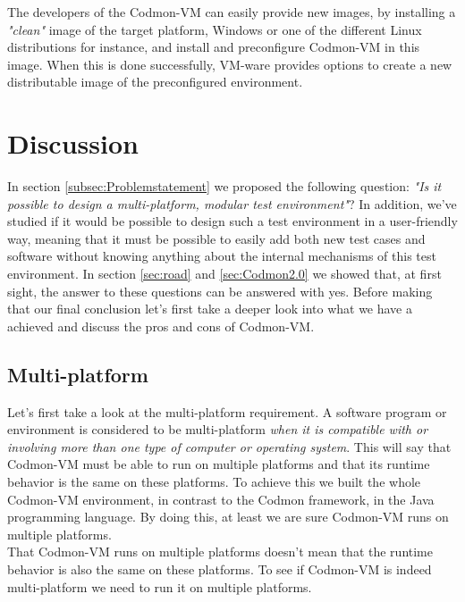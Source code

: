 \documentclass{article}
\newcommand{\project}{Codmon-VM}
\begin{document}
\noindent The developers of the \project{} can easily provide new images, by installing a \emph{"clean"} image of the target platform, Windows or one of the different Linux distributions for instance, and 
install and preconfigure \project{} in this image. When this is done successfully, VM-ware provides options to create a new distributable image of the preconfigured environment. 

\newpage
\section{Discussion}
\label{sec:evaluation}
In section \ref{subsec:Problemstatement} we proposed the following question: \emph{"Is it possible to design a multi-platform, modular test environment"}? In addition, we've studied if it would be 
possible to design such a test environment in a user-friendly way, meaning that it must be possible to easily add both new test cases and software without knowing anything about the internal mechanisms of this test environment. 
In section \ref{sec:road} and \ref{sec:Codmon2.0} we showed that, at first sight, the answer to these questions can be answered with yes. Before making that our final conclusion let's first take a deeper look 
into what we have a achieved and discuss the pros and cons of \project{}. \\

\subsection{Multi-platform}
\label{dis:multi}
Let's first take a look at the multi-platform requirement. A software program or environment is considered to be multi-platform \emph{when it is compatible with or involving more than one type of computer or 
operating system}\cite{def:multi}. This will say that \project{} must be able to run on multiple platforms and that its runtime behavior is the same on these platforms. To achieve this we built the whole 
\project{} environment, in contrast to the Codmon framework, in the Java programming language. By doing this, at least we are sure \project{} runs on multiple platforms\cite{Java}.\\

\noindent That \project{} runs on multiple platforms doesn't mean that the runtime behavior is also the same on these platforms. To see if \project{} is indeed multi-platform we need to run it on multiple 
platforms. 
\end{document}
